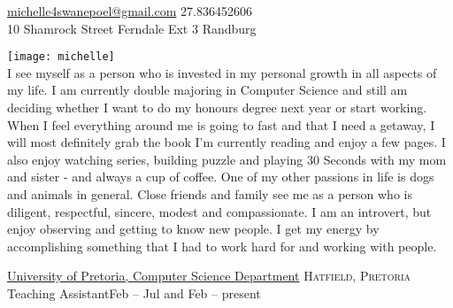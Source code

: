 

\sloppy  %



\nobreakvspace{0.3em}  %

\noindent\href{mailto:michelle4swanepoel.at.gmail.dot.com}{michelle4swanepoel\mbox{}@\mbox{}gmail.com}\sbull
\textsmaller{+}27.836452606
\\
10 Shamrock Street\sbull
Ferndale Ext 3\sbull
Randburg

\spacedhrule{0.9em}{-0.4em}  %
\begin{center}
\end{center}


\vspace{-1.3em}  %
\begin{multicols}{3}%

\noindent \texttt{[image: michelle]}\\I see myself as a person who is invested in my personal growth in all aspects of my life. I am currently double majoring in Computer Science and still am deciding whether I want to do my honours degree next year or start working.  When I feel everything around me is going to fast and that I need a getaway, I will most definitely grab the book I'm currently reading and enjoy a few pages. I also enjoy watching series, building puzzle and playing 30 Seconds with my mom and sister - and always  a cup of coffee. One of my other passions in life is dogs and animals in general. Close friends and family see me as a person who is diligent, respectful, sincere, modest and compassionate. I am an introvert, but enjoy observing and getting to know new people. I get my energy by accomplishing something that I had to work hard for and working with people.


\end{multicols}

\spacedhrule{0em}{-0.4em}


    
\headedsection
  {\href{http://www.up.ac.za}{University of Pretoria, Computer Science Department}}
  {\textsc{Hatfield, Pretoria}} {%
  \headedsubsection
    {Teaching Assistant}{Feb -- Jul and Feb -- present}
    {}
    }
        
